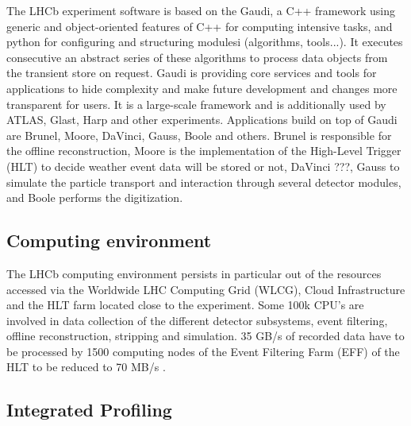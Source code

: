 \documentclass[a4paper]{jpconf}
\begin{document}
The LHCb experiment software is based on the Gaudi\cite{gaudi}, a C++ framework using generic and object-oriented features of C++ for computing intensive tasks, and python for configuring and structuring modulesi (algorithms, tools...). It executes consecutive an abstract series of these algorithms to process data objects from the transient store on request. Gaudi is providing core services and tools for applications to hide complexity and make future development and changes more transparent for users. It is a large-scale framework and is additionally used by ATLAS, Glast, Harp and other experiments.
\newline
Applications build on top of Gaudi are Brunel, Moore, DaVinci, Gauss, Boole and others. Brunel is responsible for the offline reconstruction, Moore is the implementation of the High-Level Trigger (HLT) to decide weather event data will be stored or not, DaVinci ???, Gauss to simulate the particle transport and interaction through several detector modules, and Boole performs the digitization.

\subsection{Computing environment}
\label{sec:computing_environment}

The LHCb computing environment persists in particular out of the resources accessed via the Worldwide LHC Computing Grid (WLCG), Cloud Infrastructure and the HLT farm located close to the experiment. Some 100k CPU's are involved in  data collection of the different detector subsystems, event filtering, offline reconstruction, stripping and simulation. 35 GB/s of recorded data have to be processed by 1500 computing nodes of the Event Filtering Farm (EFF) of the HLT to be reduced to 70 MB/s \cite{lhcb_hlt_opt}.

\subsection{Integrated Profiling}
\label{sec:integrated_profiling}
\end{document}
